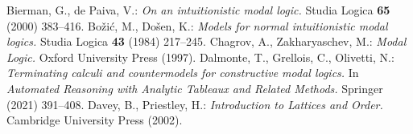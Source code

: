 \documentclass[draft]{article}
\begin{document}
\begin{thebibliography}{}
Bierman, G., de Paiva, V.:
{\it On an intuitionistic modal logic.}
Studia Logica {\bf 65} (2000) 383--416.
%
%
%
%
Bo\v{z}i\'{c}, M., Do\v{s}en, K.:
{\it Models for normal intuitionistic modal logics.}
Studia Logica {\bf 43} (1984) 217--245.
%
%
%
%
Chagrov, A., Zakharyaschev, M.:
{\it Modal Logic.}
Oxford University Press (1997).
%
%
%
%
%
%
%
%
Dalmonte, T., Grellois, C., Olivetti, N.:
{\it Terminating calculi and countermodels for constructive modal logics.}
In {\it Automated Reasoning with Analytic Tableaux and Related Methods.}
Springer (2021) 391--408.
%
%
%
%
Davey, B., Priestley, H.:
{\it Introduction to Lattices and Order.}
Cambridge University Press (2002).
%
%
%
%
%
%
%
%
%
%
%
%

\end{thebibliography}
\end{document}
